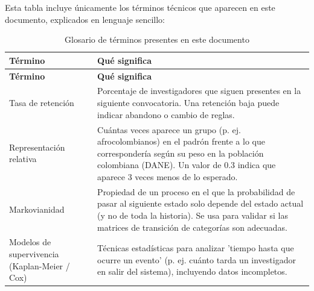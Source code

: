 Esta tabla incluye únicamente los términos técnicos que aparecen en este
documento, explicados en lenguaje sencillo:

\begingroup
\small
\setlength{\tabcolsep}{3pt}
\begin{longtable}{>{\raggedright\arraybackslash}p{4.3cm}>{\raggedright\arraybackslash}p{9.8cm}}
\caption{Glosario de términos presentes en este documento}
\label{tab:glosario}\\
\toprule
\textbf{Término} & \textbf{Qué significa} \\
\midrule
\endfirsthead
\toprule
\textbf{Término} & \textbf{Qué significa} \\
\midrule
\endhead
    Tasa de retención & Porcentaje de investigadores que siguen presentes en la siguiente convocatoria. Una retención baja puede indicar abandono o cambio de reglas.
 \\
    Representación relativa & Cuántas veces aparece un grupo (p. ej. afrocolombianos) en el padrón frente a lo que correspondería según su peso en la población colombiana (DANE). Un valor de 0.3 indica que aparece 3 veces menos de lo esperado.
 \\
    Markovianidad & Propiedad de un proceso en el que la probabilidad de pasar al siguiente estado solo depende del estado actual (y no de toda la historia). Se usa para validar si las matrices de transición de categorías son adecuadas.
 \\
    Modelos de supervivencia (Kaplan-Meier / Cox) & Técnicas estadísticas para analizar 'tiempo hasta que ocurre un evento' (p. ej. cuánto tarda un investigador en salir del sistema), incluyendo datos incompletos.
 \\
\bottomrule
\end{longtable}
\endgroup
